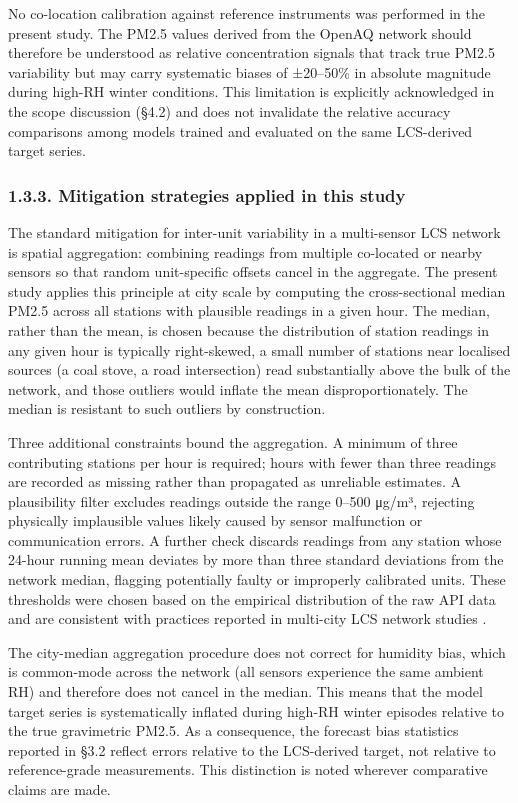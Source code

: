 No co-location calibration against reference instruments was performed in the present study. The PM2.5 values derived from the OpenAQ network should therefore be understood as relative concentration signals that track true PM2.5 variability but may carry systematic biases of ±20--50\% in absolute magnitude during high-RH winter conditions. This limitation is explicitly acknowledged in the scope discussion (§4.2) and does not invalidate the relative accuracy comparisons among models trained and evaluated on the same LCS-derived target series.

\subsubsection{1.3.3. Mitigation strategies applied in this study}\label{mitigation-strategies-applied-in-this-study}

The standard mitigation for inter-unit variability in a multi-sensor LCS network is spatial aggregation: combining readings from multiple co-located or nearby sensors so that random unit-specific offsets cancel in the aggregate. The present study applies this principle at city scale by computing the cross-sectional median PM2.5 across all stations with plausible readings in a given hour. The median, rather than the mean, is chosen because the distribution of station readings in any given hour is typically right-skewed, a small number of stations near localised sources (a coal stove, a road intersection) read substantially above the bulk of the network, and those outliers would inflate the mean disproportionately. The median is resistant to such outliers by construction.

Three additional constraints bound the aggregation. A minimum of three contributing stations per hour is required; hours with fewer than three readings are recorded as missing rather than propagated as unreliable estimates. A plausibility filter excludes readings outside the range 0--500 μg/m³, rejecting physically implausible values likely caused by sensor malfunction or communication errors. A further check discards readings from any station whose 24-hour running mean deviates by more than three standard deviations from the network median, flagging potentially faulty or improperly calibrated units. These thresholds were chosen based on the empirical distribution of the raw API data and are consistent with practices reported in multi-city LCS network studies \cite{morawska2018lowcost}.

The city-median aggregation procedure does not correct for humidity bias, which is common-mode across the network (all sensors experience the same ambient RH) and therefore does not cancel in the median. This means that the model target series is systematically inflated during high-RH winter episodes relative to the true gravimetric PM2.5. As a consequence, the forecast bias statistics reported in §3.2 reflect errors relative to the LCS-derived target, not relative to reference-grade measurements. This distinction is noted wherever comparative claims are made.

